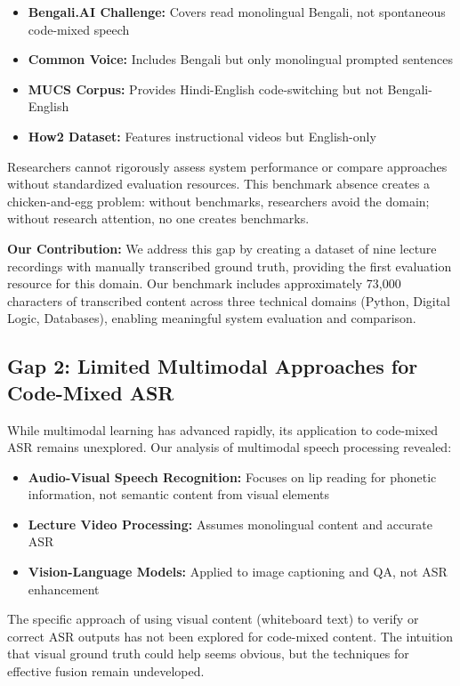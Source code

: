 \begin{itemize}
    \item \textbf{Bengali.AI Challenge:} Covers read monolingual Bengali, not spontaneous code-mixed speech
    \item \textbf{Common Voice:} Includes Bengali but only monolingual prompted sentences
    \item \textbf{MUCS Corpus:} Provides Hindi-English code-switching but not Bengali-English
    \item \textbf{How2 Dataset:} Features instructional videos but English-only
\end{itemize}

Researchers cannot rigorously assess system performance or compare approaches without standardized evaluation resources. This benchmark absence creates a chicken-and-egg problem: without benchmarks, researchers avoid the domain; without research attention, no one creates benchmarks.

\textbf{Our Contribution:} We address this gap by creating a dataset of nine lecture recordings with manually transcribed ground truth, providing the first evaluation resource for this domain. Our benchmark includes approximately 73,000 characters of transcribed content across three technical domains (Python, Digital Logic, Databases), enabling meaningful system evaluation and comparison.

\subsection{Gap 2: Limited Multimodal Approaches for Code-Mixed ASR}

While multimodal learning has advanced rapidly, its application to code-mixed ASR remains unexplored. Our analysis of multimodal speech processing revealed:

\begin{itemize}
    \item \textbf{Audio-Visual Speech Recognition:} Focuses on lip reading for phonetic information, not semantic content from visual elements
    \item \textbf{Lecture Video Processing:} Assumes monolingual content and accurate ASR
    \item \textbf{Vision-Language Models:} Applied to image captioning and QA, not ASR enhancement
\end{itemize}

The specific approach of using visual content (whiteboard text) to verify or correct ASR outputs has not been explored for code-mixed content. The intuition that visual ground truth could help seems obvious, but the techniques for effective fusion remain undeveloped.

